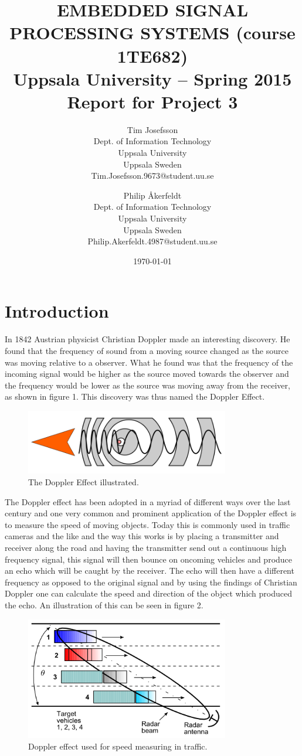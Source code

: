\documentclass[a4paper,11pt]{article}
\title{\textbf{EMBEDDED SIGNAL PROCESSING SYSTEMS (course 1TE682) \\
    Uppsala University -- Spring 2015 \\
    Report for Project 3  }}
\author{
Tim Josefsson\\
\textup{Dept. of Information Technology}\\
\textup{Uppsala University}\\
\textup{Uppsala Sweden}\\
\textup{Tim.Josefsson.9673@student.uu.se}
\and
Philip \AA kerfeldt\\
\textup{Dept. of Information Technology}\\
\textup{Uppsala University}\\
\textup{Uppsala Sweden}\\
\textup{Philip.Akerfeldt.4987@student.uu.se}
}
\date{\today}
\begin{document}
\maketitle
\newpage
\tableofcontents
\pagebreak


\section{Introduction}
In 1842 Austrian physicist Christian Doppler made an interesting discovery. He found that the frequency of sound from a moving source changed as the source was moving relative to a observer. What he found was that the frequency of the incoming signal would be higher as the source moved towards the observer and the frequency would be lower as the source was moving away from the receiver, as shown in figure 1. This discovery was thus named the Doppler Effect.\\

\begin{figure}[!ht]
  \centering
  \includegraphics[width=3.5in]{doppler.png}
  \caption{The Doppler Effect illustrated.\cite{wiki}}
  \label{doppler}
\end{figure}

\par The Doppler effect has been adopted in a myriad of different ways over the last century and one very common and prominent application of the Doppler effect is to measure the speed of moving objects. Today this is commonly used in traffic cameras and the like and the way this works is by placing a transmitter and receiver along the road and having the transmitter send out a continuous high frequency signal, this signal will then bounce on oncoming vehicles and produce an echo which will be caught by the receiver. The echo will then have a different frequency as opposed to the original signal and by using the findings of Christian Doppler one can calculate the speed and direction of the object which produced the echo.
An illustration of this can be seen in figure 2.

\begin{figure}[!ht]
  \centering
  \includegraphics[width=3.5in]{radar.png}
  \caption{Doppler effect used for speed measuring in traffic.\cite{L6}}
  \label{radar}
\end{figure}
\end{document}
